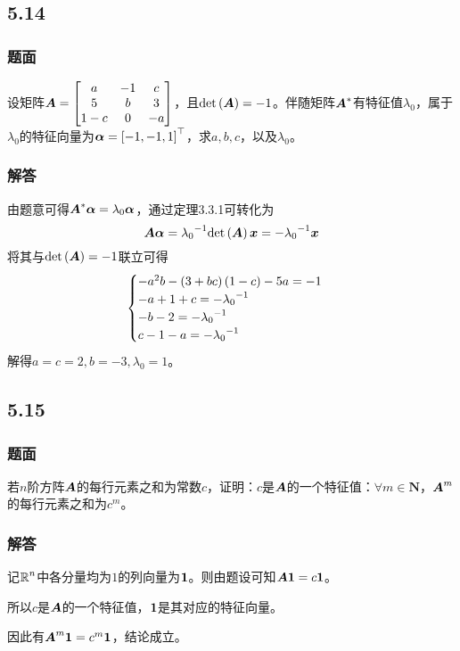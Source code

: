 \documentclass[9pt,xcolor=svgnames]{beamer} %
\begin{document}
\subsection*{5.14}
\begin{frame}
    \frametitle{题面}
    设矩阵\(\boldsymbol{A}=\begin{bmatrix}a&-1&c\\5&b&3\\1-c&0&-a\end{bmatrix}\)，且\(\mathrm{det}\left( \boldsymbol{A} \right)=-1\)。伴随矩阵\(\boldsymbol{A}^*\)有特征值\(\lambda_0\)，属于\(\lambda_0\)的特征向量为\(\boldsymbol{\alpha}=\left[ -1,-1,1 \right]^\top\)，求\(a,b,c\)，以及\(\lambda_0\)。
\end{frame}

\begin{frame}
    \frametitle{解答}
    由题意可得\(\boldsymbol{A}^*\boldsymbol{\alpha}=\lambda_0\boldsymbol{\alpha}\)，通过定理3.3.1可转化为
    \begin{equation*}
        \boldsymbol{A}\boldsymbol{\alpha}={\lambda_0}^{-1}\mathrm{det}\left( \boldsymbol{A} \right)\boldsymbol{x}=-{\lambda_0}^{-1}\boldsymbol{x}
    \end{equation*}
    \pause
    将其与\(\mathrm{det}\left( \boldsymbol{A} \right)=-1\)联立可得
    \begin{equation*}
        \begin{cases}
            -a^2b-\left( 3+bc \right)\left( 1-c \right)-5a=-1 \\
            -a+1+c=-{\lambda_0}^{-1}           \\
            -b-2=-{\lambda_0}^{-1}             \\
            c-1-a=-{\lambda_0}^{-1}
        \end{cases}
    \end{equation*}
    \pause
    解得\(a=c=2,b=-3,\lambda_0=1\)。
\end{frame}

\subsection*{5.15}
\begin{frame}
    \frametitle{题面}
    若\(n\)阶方阵\(\boldsymbol{A}\)的每行元素之和为常数\(c\)，证明：\(c\)是\(\boldsymbol{A}\)的一个特征值：\(\forall m\in\mathbf{N}\)，\(\boldsymbol{A}^m\)的每行元素之和为\(c^m\)。
\end{frame}

\begin{frame}
    \frametitle{解答}
    记\(\boldsymbol{\mathbb{R}}^n\)中各分量均为\(1\)的列向量为\(\boldsymbol{1}\)。则由题设可知\(\boldsymbol{A}\boldsymbol{1}=c\boldsymbol{1}\)。
    \pause

    所以\(c\)是\(\boldsymbol{A}\)的一个特征值，\(\boldsymbol{1}\)是其对应的特征向量。
    \pause

    因此有\(\boldsymbol{A}^m\boldsymbol{1}=c^m\boldsymbol{1}\)，结论成立。
\end{frame}
\end{document}
